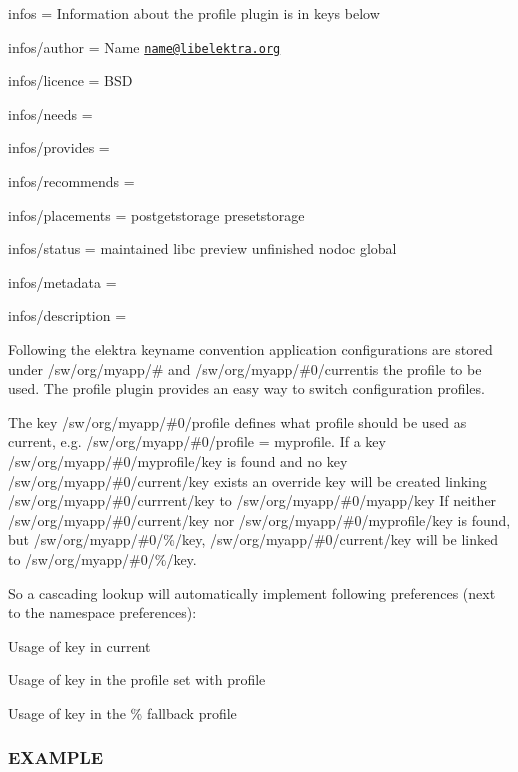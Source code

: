 
\begin{DoxyItemize}
\item infos = Information about the profile plugin is in keys below
\item infos/author = Name \href{mailto:name@libelektra.org}{\tt name@libelektra.\+org}
\item infos/licence = B\+S\+D
\item infos/needs =
\item infos/provides =
\item infos/recommends =
\item infos/placements = postgetstorage presetstorage
\item infos/status = maintained libc preview unfinished nodoc global
\item infos/metadata =
\item infos/description =
\end{DoxyItemize}

Following the elektra keyname convention application configurations are stored under {\ttfamily /sw/org/myapp/\#} and {\ttfamily /sw/org/myapp/\#0/current}is the profile to be used. The {\ttfamily profile} plugin provides an easy way to switch configuration profiles.

The key {\ttfamily /sw/org/myapp/\#0/profile} defines what profile should be used as {\ttfamily current}, e.\+g. {\ttfamily /sw/org/myapp/\#0/profile = myprofile}. If a key {\ttfamily /sw/org/myapp/\#0/myprofile/key} is found and no key {\ttfamily /sw/org/myapp/\#0/current/key} exists an override key will be created linking {\ttfamily /sw/org/myapp/\#0/currrent/key} to {\ttfamily /sw/org/myapp/\#0/myapp/key} If neither {\ttfamily /sw/org/myapp/\#0/current/key} nor {\ttfamily /sw/org/myapp/\#0/myprofile/key} is found, but {\ttfamily /sw/org/myapp/\#0/\%/key}, {\ttfamily /sw/org/myapp/\#0/current/key} will be linked to {\ttfamily /sw/org/myapp/\#0/\%/key}.

So a cascading lookup will automatically implement following preferences (next to the namespace preferences)\+:


\begin{DoxyEnumerate}
\item Usage of key in {\ttfamily current}
\item Usage of key in the profile set with {\ttfamily profile}
\item Usage of key in the {\ttfamily \%} fallback profile
\end{DoxyEnumerate}

\subsubsection*{E\+X\+A\+M\+P\+L\+E}

